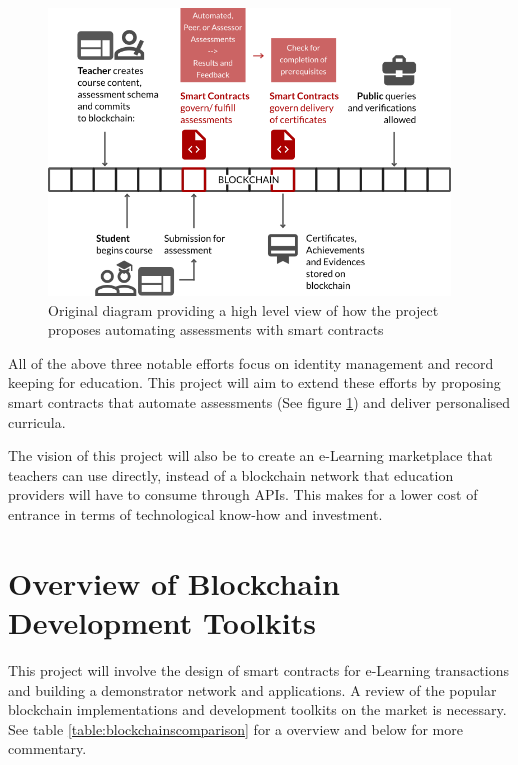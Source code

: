 \begin{figure}[!h] 
    \centering    
    \includegraphics[width=0.95\textwidth]{moocon}
    \caption[Assessment Smart Contracts Concept]
        {Original diagram providing a high level view of how the project proposes automating assessments 
        with smart contracts}
    \label{fig:moocon_assess}
\end{figure}

All of the above three notable efforts focus on identity management and record keeping for education. 
This project will aim to extend these efforts by proposing smart contracts that automate assessments 
(See figure \ref{fig:moocon_assess}) and deliver personalised curricula. 

The vision of this project will also be to create an e-Learning marketplace that teachers can use directly, 
instead of a blockchain network that education providers will have to consume through APIs. This makes for a 
lower cost of entrance in terms of technological know-how and investment.

\section{Overview of Blockchain Development Toolkits}

This project will involve the design of smart contracts for e-Learning transactions and building a demonstrator 
network and applications. A review of the popular blockchain implementations and development toolkits on the 
market is necessary. See table \ref{table:blockchainscomparison} for a overview and below for more commentary.

